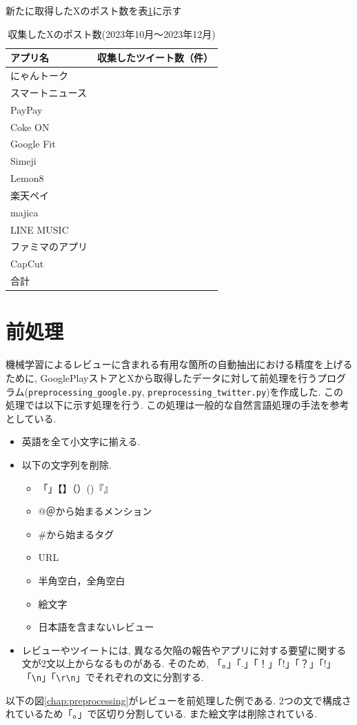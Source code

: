 新たに取得したXのポスト数を表\ref{tb:rawtweetnum2023}に示す

\begin{table}[htbp]
  \caption{収集したXのポスト数(2023年10月〜2023年12月)}
  \label{tb:rawtweetnum2023}
  \begin{center}
  \begin{tabular}{l|l}
    \hline
    アプリ名&収集したツイート数（件）\\\hline\hline
    にゃんトーク&\\\hline
    スマートニュース&\\\hline
    PayPay&\\\hline
    Coke ON&\\\hline
    Google Fit&\\\hline
    Simeji&\\\hline
    Lemon8&\\\hline
    楽天ペイ&\\\hline
    majica&\\\hline
    LINE MUSIC&\\\hline
    ファミマのアプリ&\\\hline
    CapCut&\\\hline\hline
    合計&
  \end{tabular}\end{center}
\end{table}


\section{前処理}
機械学習によるレビューに含まれる有用な箇所の自動抽出における精度を上げるために, GooglePlayストアとXから取得したデータに対して前処理を行うプログラム(\verb|preprocessing_google.py|, \verb|preprocessing_twitter.py|)を作成した. この処理では以下に示す処理を行う. この処理は一般的な自然言語処理の手法を参考としている. 
\begin{itemize}
  \item 英語を全て小文字に揃える. 
  \item 以下の文字列を削除. 
    \begin{itemize}
      \item 「」【】（）()『』
      \item @＠から始まるメンション
      \item \#から始まるタグ
      \item URL
      \item 半角空白，全角空白
      \item 絵文字
      \item 日本語を含まないレビュー
    \end{itemize}
  \item レビューやツイートには, 異なる欠陥の報告やアプリに対する要望に関する文が2文以上からなるものがある. そのため, 「。」「.」「！」「!」「？」「!」「\verb|\n|」「\verb|\r\n|」でそれぞれの文に分割する. 
\end{itemize}
以下の図\ref{chap:preprocessing}がレビューを前処理した例である. 2つの文で構成されているため「。」で区切り分割している. また絵文字は削除されている. 

